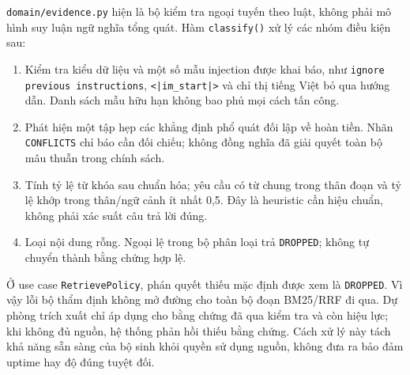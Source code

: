 \texttt{domain/evidence.py} hiện là bộ kiểm tra ngoại tuyến theo luật, không phải mô hình suy luận ngữ nghĩa tổng quát. Hàm \texttt{classify()} xử lý các nhóm điều kiện sau:
\begin{enumerate}[nosep]
  \item Kiểm tra kiểu dữ liệu và một số mẫu injection được khai báo, như \texttt{ignore previous instructions}, \texttt{<|im\_start|>} và chỉ thị tiếng Việt bỏ qua hướng dẫn. Danh sách mẫu hữu hạn không bao phủ mọi cách tấn công.
  \item Phát hiện một tập hẹp các khẳng định phổ quát đối lập về hoàn tiền. Nhãn \texttt{CONFLICTS} chỉ báo cần đối chiếu; không đồng nghĩa đã giải quyết toàn bộ mâu thuẫn trong chính sách.
  \item Tính tỷ lệ từ khóa sau chuẩn hóa; yêu cầu có từ chung trong thân đoạn và tỷ lệ khớp trong thân/ngữ cảnh ít nhất 0,5. Đây là heuristic cần hiệu chuẩn, không phải xác suất câu trả lời đúng.
  \item Loại nội dung rỗng. Ngoại lệ trong bộ phân loại trả \texttt{DROPPED}; không tự chuyển thành bằng chứng hợp lệ.
\end{enumerate}

Ở use case \texttt{RetrievePolicy}, phán quyết thiếu mặc định được xem là \texttt{DROPPED}. Vì vậy lỗi bộ thẩm định không mở đường cho toàn bộ đoạn BM25/RRF đi qua. Dự phòng trích xuất chỉ áp dụng cho bằng chứng đã qua kiểm tra và còn hiệu lực; khi không đủ nguồn, hệ thống phản hồi thiếu bằng chứng. Cách xử lý này tách khả năng sẵn sàng của bộ sinh khỏi quyền sử dụng nguồn, không đưa ra bảo đảm uptime hay độ đúng tuyệt đối.
